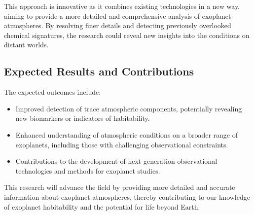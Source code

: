 \documentclass[12pt]{article}
\begin{document}
This approach is innovative as it combines existing technologies in a new way, aiming to provide a more detailed and comprehensive analysis of exoplanet atmospheres. By resolving finer details and detecting previously overlooked chemical signatures, the research could reveal new insights into the conditions on distant worlds.

\subsection{Expected Results and Contributions}
The expected outcomes include:
\begin{itemize}
    \item Improved detection of trace atmospheric components, potentially revealing new biomarkers or indicators of habitability.
    \item Enhanced understanding of atmospheric conditions on a broader range of exoplanets, including those with challenging observational constraints.
    \item Contributions to the development of next-generation observational technologies and methods for exoplanet studies.
\end{itemize}

This research will advance the field by providing more detailed and accurate information about exoplanet atmospheres, thereby contributing to our knowledge of exoplanet habitability and the potential for life beyond Earth.
\end{document}
